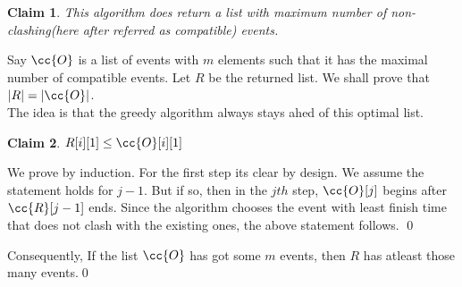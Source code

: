 \documentclass{myclass}
\newtheorem*{claim}{Claim}
\begin{document}
\begin{claim}
    This algorithm does return a list with maximum number of non-clashing(here after referred as compatible)
    events.
\end{claim}

\begin{prf}
    Say $\cc{O}$ is a list of events with $m$ elements such that it has the maximal number of compatible events.
    Let $R$ be the returned list. We shall prove that $|R|=|\cc{O}|$.\\
    The idea is that the greedy algorithm always stays ahed of this optimal list.

    \begin{claim}
        $R[i][1]\leq\cc{O}[i][1]$
    \end{claim}
    \begin{subprf}
        We prove by induction. For the first step its clear by design. We assume the statement holds for $j-1$. 
        But if so, then in the $jth$ step, $\cc{O}[j]$ begins after $\cc{R}[j-1]$ ends. Since the algorithm chooses the event with least finish
        time that does not clash with the existing ones, the above statement follows.
        \qed
    \end{subprf}

    Consequently, If the list $\cc{O}$ has got some $m$ events, then $R$ has atleast those many events.\qed
\end{prf}
\end{document}
